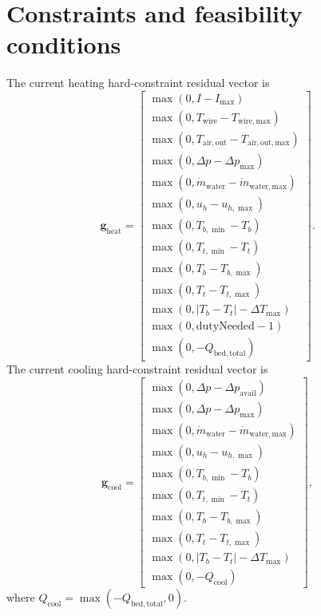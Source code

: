 \documentclass[11pt]{article}
\begin{document}
\section{Constraints and feasibility conditions}
The current heating hard-constraint residual vector is
\begin{equation}
\label{eq:heating_constraint_residuals}
\mathbf{g}_{\mathrm{heat}}=
\begin{bmatrix}
\max(0,I-I_{\max})\\
\max(0,T_{\mathrm{wire}}-T_{\mathrm{wire,max}})\\
\max(0,T_{\mathrm{air,out}}-T_{\mathrm{air,out,max}})\\
\max(0,\Delta p-\Delta p_{\max})\\
\max(0,\dot m_{\mathrm{water}}-\dot m_{\mathrm{water,max}})\\
\max(0,u_h-u_{h,\max})\\
\max(0,T_{b,\min}-T_b)\\
\max(0,T_{t,\min}-T_t)\\
\max(0,T_b-T_{b,\max})\\
\max(0,T_t-T_{t,\max})\\
\max(0,|T_b-T_t|-\Delta T_{\max})\\
\max(0,\mathrm{dutyNeeded}-1)\\
\max(0,-Q_{\mathrm{bed,total}})
\end{bmatrix}.
\end{equation}
The current cooling hard-constraint residual vector is
\begin{equation}
\label{eq:cooling_constraint_residuals}
\mathbf{g}_{\mathrm{cool}}=
\begin{bmatrix}
\max(0,\Delta p-\Delta p_{\mathrm{avail}})\\
\max(0,\Delta p-\Delta p_{\max})\\
\max(0,\dot m_{\mathrm{water}}-\dot m_{\mathrm{water,max}})\\
\max(0,u_h-u_{h,\max})\\
\max(0,T_{b,\min}-T_b)\\
\max(0,T_{t,\min}-T_t)\\
\max(0,T_b-T_{b,\max})\\
\max(0,T_t-T_{t,\max})\\
\max(0,|T_b-T_t|-\Delta T_{\max})\\
\max(0,-Q_{\mathrm{cool}})
\end{bmatrix},
\end{equation}
where \(Q_{\mathrm{cool}}=\max(-Q_{\mathrm{bed,total}},0)\).
\end{document}
